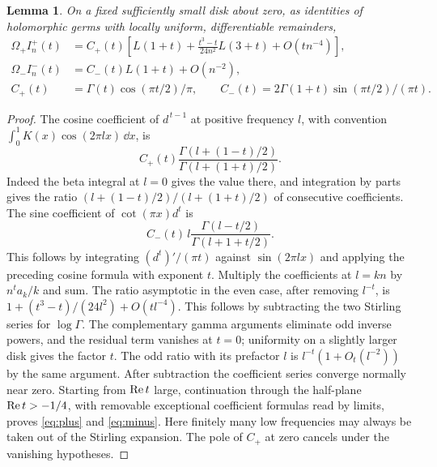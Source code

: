 \documentclass[11pt]{article}
\newtheorem{lemma}[theorem]{Lemma}
\begin{document}
\begin{lemma}\label{lem:gamma}
On a fixed sufficiently small disk about zero, as identities of holomorphic
germs with locally uniform, differentiable remainders,
\begin{align}
 \Omega_+ I_n^+(t)&=C_+(t)\left[L(1+t)
 +\frac{t^3-t}{24 n^2}L(3+t)+O(t n^{-4})\right],\label{eq:plus}\\
 \Omega_- I_n^-(t)&=C_-(t)L(1+t)+O(n^{-2}),\label{eq:minus}\\
 C_+(t)&=\Gamma(t)\cos(\pi t/2)/\pi,\qquad
 C_-(t)=2\Gamma(1+t)\sin(\pi t/2)/(\pi t).\nonumber
\end{align}
\end{lemma}
\begin{proof}
The cosine coefficient of \(d^{\,t-1}\) at positive frequency \(l\),
with convention \(\int_0^1 K(x)\cos(2\pi lx)\,\dd x\), is
\[
 C_+(t)\frac{\Gamma(l+(1-t)/2)}{\Gamma(l+(1+t)/2)}.
\]
Indeed the beta integral at \(l=0\) gives the value there, and integration
by parts gives the ratio \((l+(1-t)/2)/(l+(1+t)/2)\) of consecutive
coefficients. The sine coefficient of \(\cot(\pi x)d^t\) is
\[
 C_-(t)\,l\frac{\Gamma(l-t/2)}{\Gamma(l+1+t/2)} .
\]
This follows by integrating \((d^t)'/(\pi t)\) against \(\sin(2\pi lx)\)
and applying the preceding cosine formula with exponent \(t\).
Multiply the coefficients at \(l=kn\) by \(n^t a_k/k\) and sum.
The ratio asymptotic in the even case, after removing \(l^{-t}\), is
\(1+(t^3-t)/(24l^2)+O(t l^{-4})\).
This follows by subtracting the two Stirling series for \(\log\Gamma\).
The complementary gamma arguments eliminate odd inverse powers, and
the residual term vanishes at \(t=0\); uniformity on a slightly larger
disk gives the factor \(t\). The odd ratio with its prefactor \(l\)
is \(l^{-t}(1+O_t(l^{-2}))\) by the same argument.
After subtraction the coefficient series converge normally near zero.
Starting from \(\operatorname{Re} t\) large, continuation through the half-plane
\(\operatorname{Re} t>-1/4\), with removable exceptional coefficient formulas read
by limits, proves \eqref{eq:plus} and \eqref{eq:minus}. Here finitely
many low frequencies may always be taken out of the Stirling expansion.
The pole of \(C_+\) at zero cancels under the vanishing hypotheses.
\end{proof}
\end{document}
